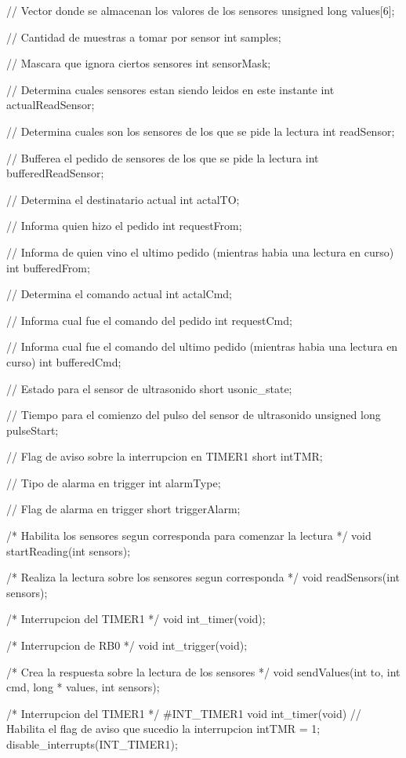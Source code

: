 {\begin{verbatimtab}
// Vector donde se almacenan los valores de los sensores
unsigned long values[6];

// Cantidad de muestras a tomar por sensor
int samples;

// Mascara que ignora ciertos sensores
int sensorMask;

// Determina cuales sensores estan siendo leidos en este instante
int actualReadSensor;

// Determina cuales son los sensores de los que se pide la lectura
int readSensor;

// Bufferea el pedido de sensores de los que se pide la lectura
int bufferedReadSensor;

// Determina el destinatario actual
int actalTO;

// Informa quien hizo el pedido
int requestFrom;

// Informa de quien vino el ultimo pedido (mientras habia una lectura en curso)
int bufferedFrom;

// Determina el comando actual
int actalCmd;

// Informa cual fue el comando del pedido
int requestCmd;

// Informa cual fue el comando del ultimo pedido (mientras habia una lectura en curso)
int bufferedCmd;

// Estado para el sensor de ultrasonido
short usonic_state;

// Tiempo para el comienzo del pulso del sensor de ultrasonido
unsigned long pulseStart;

// Flag de aviso sobre la interrupcion en TIMER1
short intTMR;

// Tipo de alarma en trigger
int alarmType;

// Flag de alarma en trigger
short triggerAlarm;

/* Habilita los sensores segun corresponda para comenzar la lectura */
void startReading(int sensors);

/* Realiza la lectura sobre los sensores segun corresponda */
void readSensors(int sensors);

/* Interrupcion del TIMER1 */
void int_timer(void);

/* Interrupcion de RB0 */
void int_trigger(void);

/* Crea la respuesta sobre la lectura de los sensores */
void sendValues(int to, int cmd, long * values, int sensors);

/* Interrupcion del TIMER1 */
#INT_TIMER1
void int_timer(void)
{
	// Habilita el flag de aviso que sucedio la interrupcion
	intTMR = 1;
	disable_interrupts(INT_TIMER1);
}


\end{verbatimtab}}
